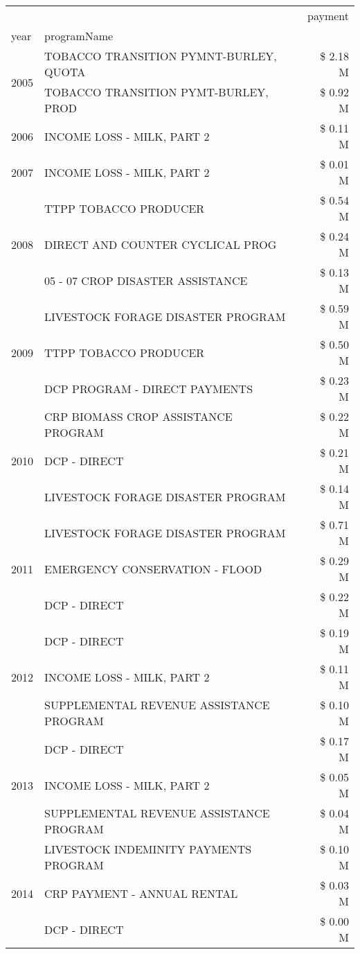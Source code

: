 \begin{tabular}{llr}
\toprule
 &  & payment \\
year & programName &  \\
\midrule
\multirow[t]{2}{*}{2005} & TOBACCO TRANSITION PYMNT-BURLEY, QUOTA & \$ 2.18 M \\
 & TOBACCO TRANSITION PYMT-BURLEY, PROD & \$ 0.92 M \\
\cline{1-3}
2006 & INCOME LOSS - MILK, PART 2 & \$ 0.11 M \\
\cline{1-3}
2007 & INCOME LOSS - MILK, PART 2 & \$ 0.01 M \\
\cline{1-3}
\multirow[t]{3}{*}{2008} & TTPP TOBACCO PRODUCER & \$ 0.54 M \\
 & DIRECT AND COUNTER CYCLICAL PROG & \$ 0.24 M \\
 & 05 - 07 CROP DISASTER ASSISTANCE & \$ 0.13 M \\
\cline{1-3}
\multirow[t]{3}{*}{2009} & LIVESTOCK FORAGE DISASTER  PROGRAM & \$ 0.59 M \\
 & TTPP TOBACCO PRODUCER & \$ 0.50 M \\
 & DCP PROGRAM - DIRECT PAYMENTS & \$ 0.23 M \\
\cline{1-3}
\multirow[t]{3}{*}{2010} & CRP BIOMASS CROP ASSISTANCE PROGRAM & \$ 0.22 M \\
 & DCP - DIRECT & \$ 0.21 M \\
 & LIVESTOCK FORAGE DISASTER PROGRAM & \$ 0.14 M \\
\cline{1-3}
\multirow[t]{3}{*}{2011} & LIVESTOCK FORAGE DISASTER PROGRAM & \$ 0.71 M \\
 & EMERGENCY CONSERVATION - FLOOD & \$ 0.29 M \\
 & DCP - DIRECT & \$ 0.22 M \\
\cline{1-3}
\multirow[t]{3}{*}{2012} & DCP - DIRECT & \$ 0.19 M \\
 & INCOME LOSS - MILK, PART 2 & \$ 0.11 M \\
 & SUPPLEMENTAL REVENUE ASSISTANCE PROGRAM & \$ 0.10 M \\
\cline{1-3}
\multirow[t]{3}{*}{2013} & DCP - DIRECT & \$ 0.17 M \\
 & INCOME LOSS - MILK, PART 2 & \$ 0.05 M \\
 & SUPPLEMENTAL REVENUE ASSISTANCE PROGRAM & \$ 0.04 M \\
\cline{1-3}
\multirow[t]{3}{*}{2014} & LIVESTOCK INDEMINITY PAYMENTS PROGRAM & \$ 0.10 M \\
 & CRP PAYMENT - ANNUAL RENTAL & \$ 0.03 M \\
 & DCP - DIRECT & \$ 0.00 M \\

\end{tabular}
